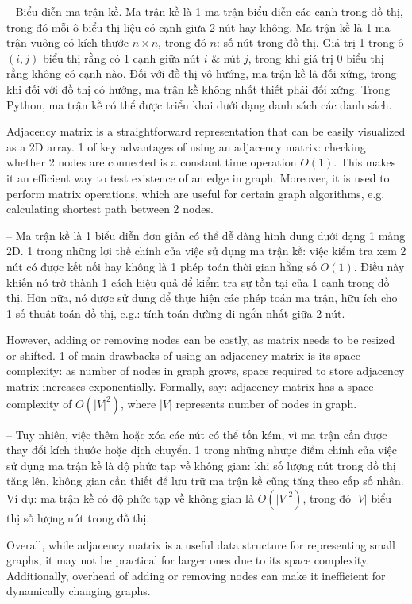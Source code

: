 \documentclass{article}
\begin{document}
\begin{itemize}
\begin{itemize}
\begin{itemize}
            -- {\sf Biểu diễn ma trận kề.} Ma trận kề là 1 ma trận biểu diễn các cạnh trong đồ thị, trong đó mỗi ô biểu thị liệu có cạnh giữa 2 nút hay không. Ma trận kề là 1 ma trận vuông có kích thước $n\times n$, trong đó $n$: số nút trong đồ thị. Giá trị 1 trong ô $(i, j)$ biểu thị rằng có 1 cạnh giữa nút $i$ \& nút $j$, trong khi giá trị 0 biểu thị rằng không có cạnh nào. Đối với đồ thị vô hướng, ma trận kề là đối xứng, trong khi đối với đồ thị có hướng, ma trận kề không nhất thiết phải đối xứng. Trong Python, ma trận kề có thể được triển khai dưới dạng danh sách các danh sách.

            Adjacency matrix is a straightforward representation that can be easily visualized as a 2D array. 1 of key advantages of using an adjacency matrix: checking whether 2 nodes are connected is a constant time operation $O(1)$. This makes it an efficient way to test existence of an edge in graph. Moreover, it is used to perform matrix operations, which are useful for certain graph algorithms, e.g. calculating shortest path between 2 nodes.

            -- Ma trận kề là 1 biểu diễn đơn giản có thể dễ dàng hình dung dưới dạng 1 mảng 2D. 1 trong những lợi thế chính của việc sử dụng ma trận kề: việc kiểm tra xem 2 nút có được kết nối hay không là 1 phép toán thời gian hằng số $O(1)$. Điều này khiến nó trở thành 1 cách hiệu quả để kiểm tra sự tồn tại của 1 cạnh trong đồ thị. Hơn nữa, nó được sử dụng để thực hiện các phép toán ma trận, hữu ích cho 1 số thuật toán đồ thị, e.g.: tính toán đường đi ngắn nhất giữa 2 nút.

            However, adding or removing nodes can be costly, as matrix needs to be resized or shifted. 1 of main drawbacks of using an adjacency matrix is its space complexity: as number of nodes in graph grows, space required to store adjacency matrix increases exponentially. Formally, say: adjacency matrix has a space complexity of $O(|V|^2)$, where $|V|$ represents number of nodes in graph.

            -- Tuy nhiên, việc thêm hoặc xóa các nút có thể tốn kém, vì ma trận cần được thay đổi kích thước hoặc dịch chuyển. 1 trong những nhược điểm chính của việc sử dụng ma trận kề là độ phức tạp về không gian: khi số lượng nút trong đồ thị tăng lên, không gian cần thiết để lưu trữ ma trận kề cũng tăng theo cấp số nhân. Ví dụ: ma trận kề có độ phức tạp về không gian là $O(|V|^2)$, trong đó $|V|$ biểu thị số lượng nút trong đồ thị.

            Overall, while adjacency matrix is a useful data structure for representing small graphs, it may not be practical for larger ones due to its space complexity. Additionally, overhead of adding or removing nodes can make it inefficient for dynamically changing graphs.


\end{itemize}
\end{itemize}
\end{itemize}
\end{document}
